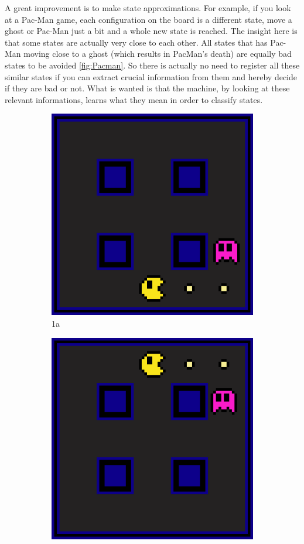 A great improvement is to make state approximations.  For example, if you look at a Pac-Man game, each configuration on the board is a different state, move a ghost or Pac-Man just a bit and a whole new state is reached. The insight here is that some states are actually very close to each other. All states that has Pac-Man moving close to a ghost (which results in PacMan's death) are equally bad states to be avoided \ref{fig:Pacman}. So there is actually no need to register all these similar states if you can extract crucial information from them and hereby decide if they are bad or not. What is wanted is that the machine, by looking at these relevant informations, learns what they mean in order to classify states.

\begin{figure}[h]
	\begin{subfigure}{.5\textwidth}
		\centering
		\includegraphics[width=.8\linewidth]{Cap3/pacman1}
		\caption{1a}
		\label{fig:sfig1}
	\end{subfigure}%
	\begin{subfigure}{.5\textwidth}
		\centering
		\includegraphics[width=.8\linewidth]{Cap3/pacman2}

\end{subfigure}
\end{figure}
